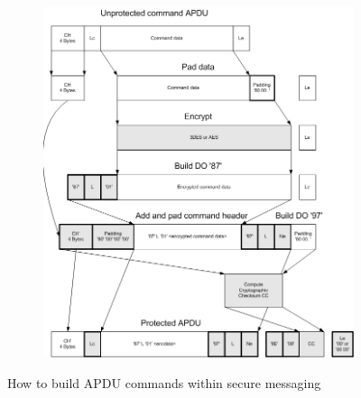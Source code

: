 \documentclass[bsc,frontabs,twoside,singlespacing,parskip,deptreport]{infthesis}     %
\begin{document}
\begin{figure}[H]
\centering
\begin{subfigure}{1\textwidth}
  \includegraphics[width=1\linewidth]
  {images/section_7/7.3/sm_command.png}
\end{subfigure}
\caption{How to build APDU commands within secure messaging}
\end{figure}
\end{document}
